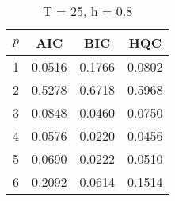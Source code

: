 \begin{table}[ht]
\captionsetup{justification=raggedright,singlelinecheck=false}
\caption*{T = 25, h = 0.8}
\begin{tabular}{c|ccc}
  $p$ & AIC & BIC & HQC \\\hline
  1 & 0.0516 & 0.1766 & 0.0802 \\
  2 & 0.5278 & 0.6718 & 0.5968 \\
  3 & 0.0848 & 0.0460 & 0.0750 \\
  4 & 0.0576 & 0.0220 & 0.0456 \\
  5 & 0.0690 & 0.0222 & 0.0510 \\
  6 & 0.2092 & 0.0614 & 0.1514 \\
\end{tabular}
\end{table}
